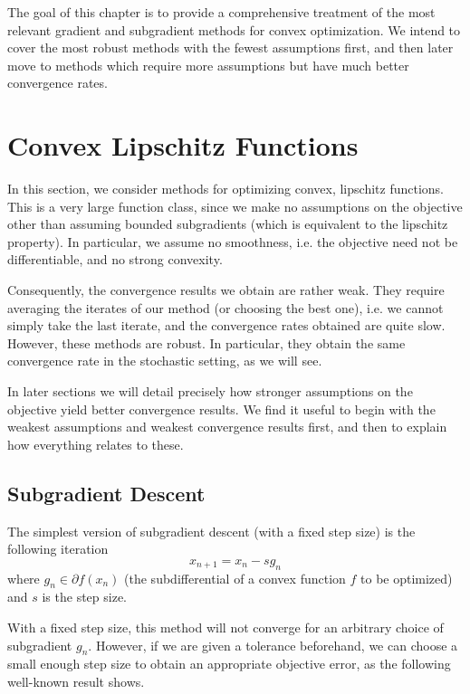 The goal of this chapter is to provide a comprehensive treatment of the most relevant
gradient and subgradient methods for convex optimization. 
We intend to cover
the most robust methods with the fewest assumptions first, and then later move to
methods which require more assumptions but have much better convergence rates.

\section{Convex Lipschitz Functions}
In this section, we consider methods for optimizing convex, lipschitz functions. This is a very large function
class, since we make no assumptions on the objective other than assuming bounded subgradients (which is
equivalent to the lipschitz property). In particular, we assume no smoothness, i.e. the objective need not
be differentiable, and no strong convexity.

Consequently, the convergence results we obtain are rather weak. They require averaging the iterates of our method
(or choosing the best one), i.e. we cannot simply take the last iterate, and the convergence rates obtained are
quite slow. However, these methods are robust. In particular, they obtain the same convergence rate
in the stochastic setting, as we will see.

In later sections we will detail precisely
how stronger assumptions on the objective yield better convergence results. We find it useful to
begin with the weakest assumptions and weakest convergence results first, and then to explain how everything relates to
these.

\subsection{Subgradient Descent}
The simplest version of subgradient descent (with a fixed step size) is the following iteration
\begin{equation}\label{subgradient_descent}
 x_{n+1} = x_n - sg_n
\end{equation}
where $g_n\in \partial f(x_n)$ (the subdifferential of a convex function $f$ to be optimized) and $s$ is the 
step size.

With a fixed step size, this method will not converge for an arbitrary choice of subgradient $g_n$. 
However, if we are given a tolerance beforehand, we can choose
a small enough step size to obtain an appropriate objective error, as the following well-known result shows.

